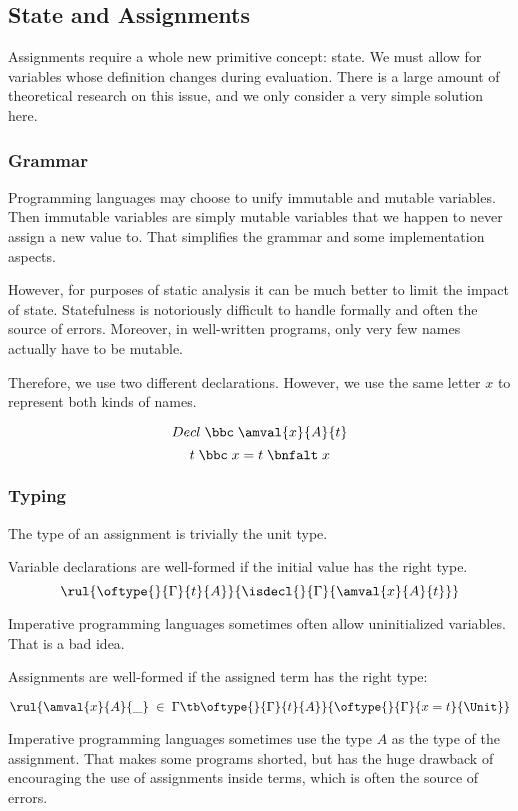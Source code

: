 \subsection{State and Assignments}

Assignments require a whole new primitive concept: state.
We must allow for variables whose definition changes during evaluation.
There is a large amount of theoretical research on this issue, and we only consider a very simple solution here.

\subsubsection{Grammar}

Programming languages may choose to unify immutable and mutable variables.
Then immutable variables are simply mutable variables that we happen to never assign a new value to.
That simplifies the grammar and some implementation aspects.

However, for purposes of static analysis it can be much better to limit the impact of state.
Statefulness is notoriously difficult to handle formally and often the source of errors.
Moreover, in well-written programs, only very few names actually have to be mutable.

Therefore, we use two different declarations.
However, we use the same letter $x$ to represent both kinds of names.

\[Decl \;\bbc\; \amval{x}{A}{t}\]
\[t \;\bbc\; x=t \;\bnfalt\; x\]

\subsubsection{Typing}

The type of an assignment is trivially the unit type.

Variable declarations are well-formed if the initial value has the right type.
\[\rul{\oftype{}{\Gamma}{t}{A}}
      {\isdecl{}{\Gamma}{\amval{x}{A}{t}}}
\]

Imperative programming languages sometimes often allow uninitialized variables.
That is a bad idea.

Assignments are well-formed if the assigned term has the right type:

\[\rul{\amval{x}{A}{\_} \;\in\;\Gamma \tb \oftype{}{\Gamma}{t}{A}}
      {\oftype{}{\Gamma}{x=t}{\Unit}}
\]

Imperative programming languages sometimes use the type $A$ as the type of the assignment.
That makes some programs shorted, but has the huge drawback of encouraging the use of assignments inside terms, which is often the source of errors.

